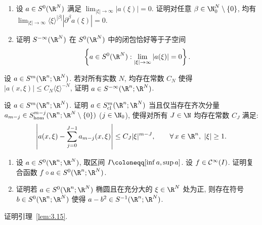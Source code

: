 \begin{exer}[符号空间的闭包]\label{ex:3.7}
\begin{enumerate}
    \item 设 $a \in S^0(\R^N)$ 满足 $\lim_{|\xi| \to \infty} |a(\xi)| = 0$. 证明对任意 $\beta \in \N_0^N \setminus \{0\}$, 均有 $\lim_{|\xi| \to \infty} \langle \xi \rangle^{|\beta|} |\partial^\beta a(\xi)| = 0$.
    \item 证明 $S^{-\infty}(\R^N)$ 在 $S^0(\R^N)$ 中的闭包恰好等于子空间
    \begin{equation}\label{eq:3.66}
        \left\{ a \in S^0(\R^N) : \lim_{|\xi| \to \infty} |a(\xi)| = 0 \right\}.
    \end{equation}
\end{enumerate}
\end{exer}

\begin{exer}[通过逐点界判定残余符号]\label{ex:3.8}
设 $a \in S^m(\R^n; \R^N)$. 若对所有实数 $N$, 均存在常数 $C_N$ 使得 $|a(x, \xi)| \le C_N \langle \xi \rangle^{-N}$, 证明 $a \in S^{-\infty}(\R^n; \R^N)$.
\end{exer}

\begin{exer}[通过逐点余项界判定经典符号]\label{ex:3.9}
设 $a \in S^m(\R^n; \R^N)$. 证明 $a \in S_{\mathrm{cl}}^m(\R^n; \R^N)$ 当且仅当存在齐次分量 $a_{m-j} \in S_{\mathrm{hom}}^{m-j}(\R^n; \R^N \setminus \{0\})$ ($j \in \N_0$), 使得对所有 $J \in \N$ 均存在常数 $C_J$ 满足:
\begin{equation}\label{eq:3.67}
    \left| a(x, \xi) - \sum_{j=0}^{J-1} a_{m-j}(x, \xi) \right| \le C_J |\xi|^{m - J}, \qquad \forall\,x \in \R^n, \ |\xi| \ge 1.
\end{equation}
\end{exer}

\begin{exer}[函数与符号的复合及开方]\label{ex:3.10}
\begin{enumerate}
    \item 设 $a \in S^0(\R^n; \R^N)$, 取区间 $I \defeq [\inf a, \sup a]$. 设 $f \in \mathcal{C}^\infty(I)$. 证明复合函数 $f \circ a \in S^0(\R^n; \R^N)$.
    \item 证明若 $a \in S^0(\R^n; \R^N)$ 椭圆且在充分大的 $\xi \in \R^N$ 处为正, 则存在符号 $b \in S^0(\R^n; \R^N)$ 使得 $a - b^2 \in S^{-1}(\R^n; \R^N)$.
\end{enumerate}
\end{exer}

\begin{exer}[经典符号齐次分量的唯一性证明]\label{ex:3.11}
证明引理~\ref{lem:3.15}.
\end{exer}

